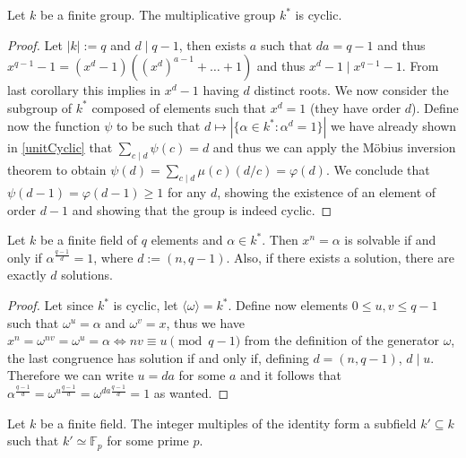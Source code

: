 \begin{theorem}
    Let \(k\) be a finite group. The multiplicative group \(k^\ast\) is cyclic.
\end{theorem}

\begin{proof}
    Let \(|k| := q\) and \(d \mid q-1\), then exists \(a\) such that \(da = q-1\)
    and thus \(x^{q-1} - 1 = (x^d - 1) ((x^d)^{a-1} + \dots + 1)\) and thus
    \(x^d - 1 \mid x^{q-1} - 1\). From last corollary this implies in \(x^d - 1\)
    having \(d\) distinct roots. We now consider the subgroup of \(k^\ast\)
    composed of elements such that \(x^d = 1\) (they have order \(d\)). Define
    now the function \(\psi\) to be such that \(d \mapsto |\{\alpha \in k^\ast :
    \alpha^d = 1\}|\) we have already shown in \ref{unitCyclic} that \(\sum_{c
        \mid d} \psi(c) = d\) and thus we can apply the Möbius inversion theorem to
    obtain  \(\psi(d) = \sum_{c\mid d} \mu(c) (d/c) = \varphi(d)\). We conclude
    that \(\psi(d-1) = \varphi(d-1) \geqslant 1\) for any \(d\), showing the
    existence of an element of order \(d-1\) and showing that the group is indeed
    cyclic.
\end{proof}

\begin{proposition}
    Let \(k\) be a finite field of \(q\) elements and \(\alpha \in k^\ast\). Then
    \(x^n = \alpha\) is solvable if and only if \(\alpha^{\frac{q-1}{d}} = 1\),
    where \(d := (n, q-1)\). Also, if there exists a solution, there are exactly
    \(d\) solutions.
\end{proposition}

\begin{proof}
    Let since \(k^\ast\) is cyclic, let \(\langle \omega \rangle = k^\ast\).
    Define now elements \(0 \leqslant u,v \leqslant q-1\) such that \(\omega^{u}
    = \alpha\) and \(\omega^{v} = x\), thus we have \(x^n = \omega^{nv} =
    \omega^u = \alpha \Leftrightarrow nv \equiv u \pmod{q-1}\) from the
    definition of the generator \(\omega\), the last congruence has solution if
    and only if, defining \(d = (n, q-1)\), \(d \mid u\). Therefore we can write
    \(u=da\) for some \(a\) and it follows that \(\alpha^{\frac{q-1}{d}} =
    \omega^{u \frac{q-1}{d}} = \omega^{da \frac{q-1}{d}} = 1\) as wanted.
\end{proof}

\begin{proposition}
    Let \(k\) be a finite field. The integer multiples of the identity form a
    subfield \(k' \subseteq k\) such that \(k' \simeq \mathbb{F}_p\) for some
    prime \(p\).
\end{proposition}

